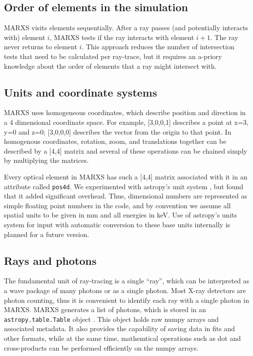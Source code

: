 \documentclass[twocolumn]{aastex61}
\begin{document}
\subsection{Order of elements in the simulation}
MARXS visits elements sequentially. After a ray passes (and potentially
interacts with) element $i$, MARXS tests if the ray interacts with element
$i+1$. The ray never returns to element $i$. This approach reduces the number
of intersection tests that need to be calculated per ray-trace, but it requires
an a-priory knowledge about the order of elements that a ray might intersect
with.

\subsection{Units and coordinate systems}
MARXS uses homogeneous coordinates, which describe position and direction in a
4 dimensional coordinate space. For example, [3,0,0,1] describes a point at
x=3, y=0 and z=0; [3,0,0,0] describes the vector from the origin to that
point. In homogenous coordinates, rotation, zoom, and translations together can
be described by a [4,4] matrix and several of these operations can be chained
simply by multiplying the matrices.

Every optical element in MARXS has such a [4,4] matrix associated with it in an
attribute called \texttt{pos4d}. We experimented with astropy's unit system
\citep{2013A&A...558A..33A}, but found that it added significant
overhead. Thus, dimensional numbers are represented as simple floating point
numbers in the code, and by convention we assume all spatial units to be given
in mm and all energies in keV. Use of astropy's units system for input with
automatic conversion to these base units internally is planned for a future
version.

\subsection{Rays and photons}
The fundamental unit of ray-tracing is a single ``ray'', which can be
interpreted as a wave package of many photons or as a single
photon. Most X-ray detectors are photon counting, thus it is
convenient to identify each ray with a single photon in MARXS.
MARXS generates a list of photons, which is stored in an
\texttt{astropy.table.Table} object \citep{2013A&A...558A..33A}. This object
holds raw numpy arrays and associated metadata. It also provides the capability
of saving data in fits and other formats, while at the same time, mathemtical
operations such as dot and cross-products can be performed efficiently on the
numpy arrays.
\end{document}

